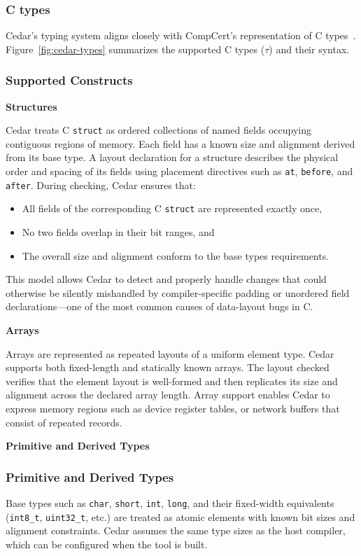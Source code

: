 \subsubsection{C types}

Cedar's typing system aligns closely with CompCert's
    representation of C types~\autocite{leroy2012compcert}.
Figure~\ref{fig:cedar-types} summarizes the supported
C types ($\tau$) and their syntax.


\subsubsection{Supported Constructs}


\textbf{Structures}

Cedar treats C \texttt{struct} as ordered collections of named
fields occupying contiguous regions of memory.
Each field has a known size and alignment derived from its
base type.
A layout declaration for a structure describes the physical
order and spacing of its fields using placement
directives
such as \texttt{at}, \texttt{before}, and \texttt{after}.
During checking, Cedar ensures that:
\begin{itemize}
    \item All fields of the corresponding C \texttt{struct}  are
    represented exactly once,
    \item No two fields overlap in their bit ranges, and
    \item The overall size and alignment conform to the
    base types requirements.
\end{itemize}

This model allows Cedar to detect and properly handle changes that could
otherwise be silently mishandled by compiler-specific padding or unordered
field declarations—one of the most common causes of data-layout bugs in C.



\textbf{Arrays}

Arrays are represented as repeated layouts of a uniform element type.
Cedar supports both fixed-length and statically known arrays.
The layout checked verifies that the element layout
is well-formed and then replicates its size and alignment
across the declared array length.
Array support enables Cedar to express memory regions such as
device register tables, or network buffers that consist of repeated
records.

\textbf{Primitive and Derived Types}

\subsubsection{Primitive and Derived Types}
Base types such as \texttt{char}, \texttt{short}, \texttt{int}, \texttt{long},
and their fixed-width equivalents (\texttt{int8\_t}, \texttt{uint32\_t}, etc.)
are treated as atomic elements with known bit sizes and alignment constraints.
Cedar assumes the same type sizes as the host compiler, which can be
configured when the tool is built.

